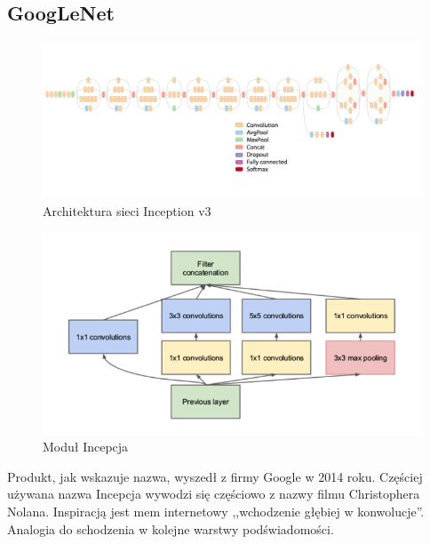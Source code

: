 \documentclass[12pt,a4paper,twoside,titlepage,openright]{book}
\begin{document}
\begin{itemize}
\section{GoogLeNet}
\begin{figure}[h]
	\centering
			\includegraphics[resolution=100, scale=0.36]{inceptionv3architecture.png}
		\caption{Architektura sieci Inception v3}
\end{figure}

\begin{figure}[ht]
	\centering
			\includegraphics[resolution=100, scale=0.7]{inceptionModule.png}
		\caption{Moduł Incepcja}
\end{figure}

Produkt, jak wskazuje nazwa, wyszedł z firmy Google w 2014 roku. Częściej używana nazwa Incepcja wywodzi się częściowo z nazwy filmu Christophera Nolana. Inspiracją jest mem internetowy ,,wchodzenie głębiej w konwolucje''. Analogia do schodzenia w kolejne warstwy podświadomości.\cite{siteDeeper}


\end{itemize}
\end{document}
